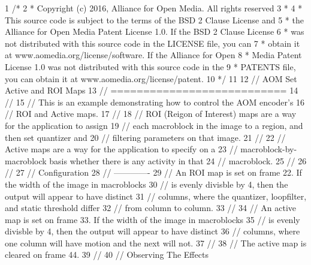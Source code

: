\begin{DoxyCodeInclude}
1 \textcolor{comment}{/*}
2 \textcolor{comment}{ * Copyright (c) 2016, Alliance for Open Media. All rights reserved}
3 \textcolor{comment}{ *}
4 \textcolor{comment}{ * This source code is subject to the terms of the BSD 2 Clause License and}
5 \textcolor{comment}{ * the Alliance for Open Media Patent License 1.0. If the BSD 2 Clause License}
6 \textcolor{comment}{ * was not distributed with this source code in the LICENSE file, you can}
7 \textcolor{comment}{ * obtain it at www.aomedia.org/license/software. If the Alliance for Open}
8 \textcolor{comment}{ * Media Patent License 1.0 was not distributed with this source code in the}
9 \textcolor{comment}{ * PATENTS file, you can obtain it at www.aomedia.org/license/patent.}
10 \textcolor{comment}{ */}
11 
12 \textcolor{comment}{// AOM Set Active and ROI Maps}
13 \textcolor{comment}{// ===========================}
14 \textcolor{comment}{//}
15 \textcolor{comment}{// This is an example demonstrating how to control the AOM encoder's}
16 \textcolor{comment}{// ROI and Active maps.}
17 \textcolor{comment}{//}
18 \textcolor{comment}{// ROI (Reigon of Interest) maps are a way for the application to assign}
19 \textcolor{comment}{// each macroblock in the image to a region, and then set quantizer and}
20 \textcolor{comment}{// filtering parameters on that image.}
21 \textcolor{comment}{//}
22 \textcolor{comment}{// Active maps are a way for the application to specify on a}
23 \textcolor{comment}{// macroblock-by-macroblock basis whether there is any activity in that}
24 \textcolor{comment}{// macroblock.}
25 \textcolor{comment}{//}
26 \textcolor{comment}{//}
27 \textcolor{comment}{// Configuration}
28 \textcolor{comment}{// -------------}
29 \textcolor{comment}{// An ROI map is set on frame 22. If the width of the image in macroblocks}
30 \textcolor{comment}{// is evenly divisble by 4, then the output will appear to have distinct}
31 \textcolor{comment}{// columns, where the quantizer, loopfilter, and static threshold differ}
32 \textcolor{comment}{// from column to column.}
33 \textcolor{comment}{//}
34 \textcolor{comment}{// An active map is set on frame 33. If the width of the image in macroblocks}
35 \textcolor{comment}{// is evenly divisble by 4, then the output will appear to have distinct}
36 \textcolor{comment}{// columns, where one column will have motion and the next will not.}
37 \textcolor{comment}{//}
38 \textcolor{comment}{// The active map is cleared on frame 44.}
39 \textcolor{comment}{//}
40 \textcolor{comment}{// Observing The Effects}

\end{DoxyCodeInclude}
